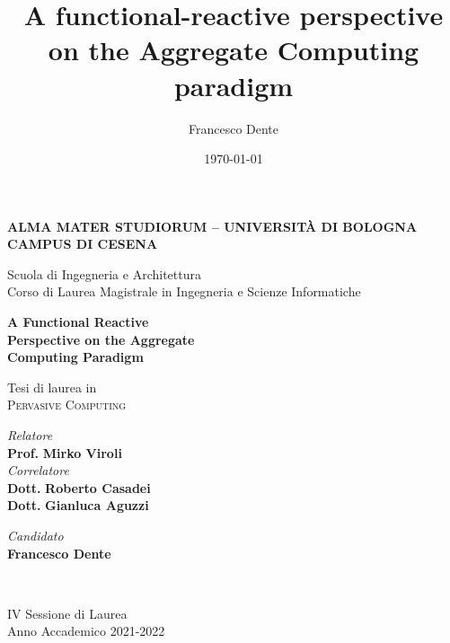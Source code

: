 \title{A functional-reactive perspective on the Aggregate Computing paradigm}
\author{Francesco Dente}
\date{\today}

\begin{titlepage}
	\begin{center}
		
		\large
		\textbf{ALMA MATER STUDIORUM -- UNIVERSITÀ DI BOLOGNA \\ CAMPUS DI CESENA}
		\\
		\noindent\hrulefill
		\vspace{0.4cm}
		
		\Large
		Scuola di Ingegneria e Architettura \\
		Corso di Laurea Magistrale in Ingegneria e Scienze Informatiche
		
		\Huge
		\vspace{4cm}
		\textbf{
			A Functional Reactive
			\\
			Perspective on the Aggregate
			\\
			Computing Paradigm
		}
		
		\large
		\vspace{1cm}
		Tesi di laurea in 
		\\
		\textsc{Pervasive Computing}
		
		\vspace{5.5cm}
		\begin{minipage}[t]{0.64\textwidth}
			\begin{flushleft}
				\textit{Relatore} 
				\\ 
				\textbf{Prof.} \textbf{Mirko Viroli}
				\\
				\vspace{0.4cm}
				\textit{Correlatore} 
				\\
				\textbf{Dott.} \textbf{Roberto Casadei}
				\\
				\textbf{Dott.} \textbf{Gianluca Aguzzi}
			\end{flushleft}
		\end{minipage}
		\begin{minipage}[t]{0.34\textwidth}
			\begin{flushright}
				\textit{Candidato} 
				\\ 
				\textbf{Francesco Dente}
			\end{flushright}
		\end{minipage}\\
		
		\vfill
		\noindent\hrulefill
		\vspace{0.3cm}
		\Large
		
		IV Sessione di Laurea
		\\
		Anno Accademico 2021-2022
	\end{center}
\end{titlepage}
\restoregeometry
